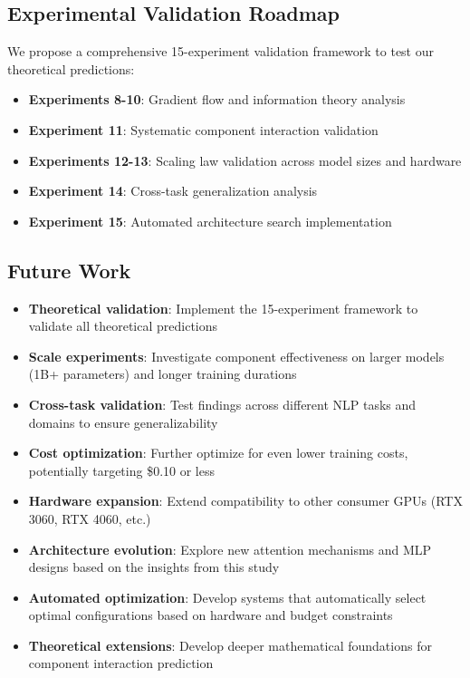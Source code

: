 \documentclass[11pt,a4paper]{article}
\begin{document}
\subsection{Experimental Validation Roadmap}

We propose a comprehensive 15-experiment validation framework to test our theoretical predictions:

\begin{itemize}
    \item \textbf{Experiments 8-10}: Gradient flow and information theory analysis
    \item \textbf{Experiment 11}: Systematic component interaction validation
    \item \textbf{Experiments 12-13}: Scaling law validation across model sizes and hardware
    \item \textbf{Experiment 14}: Cross-task generalization analysis
    \item \textbf{Experiment 15}: Automated architecture search implementation
\end{itemize}

\subsection{Future Work}

\begin{itemize}
    \item \textbf{Theoretical validation}: Implement the 15-experiment framework to validate all theoretical predictions
    \item \textbf{Scale experiments}: Investigate component effectiveness on larger models (1B+ parameters) and longer training durations
    \item \textbf{Cross-task validation}: Test findings across different NLP tasks and domains to ensure generalizability
    \item \textbf{Cost optimization}: Further optimize for even lower training costs, potentially targeting \$0.10 or less
    \item \textbf{Hardware expansion}: Extend compatibility to other consumer GPUs (RTX 3060, RTX 4060, etc.)
    \item \textbf{Architecture evolution}: Explore new attention mechanisms and MLP designs based on the insights from this study
    \item \textbf{Automated optimization}: Develop systems that automatically select optimal configurations based on hardware and budget constraints
    \item \textbf{Theoretical extensions}: Develop deeper mathematical foundations for component interaction prediction
\end{itemize}
\end{document}
